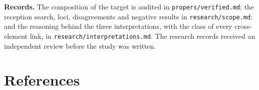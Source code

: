 {\textbf{Records.} The composition of the target is audited in
\texttt{propers/verified.md}; the reception search, loci, disagreements and
negative results in \texttt{research/scope.md}; and the reasoning behind the
three interpretations, with the class of every cross-element link, in
\texttt{research/interpretations.md}. The research records received an
independent review before the study was written.
\par}

\section*{References}
\label{sec:references}

